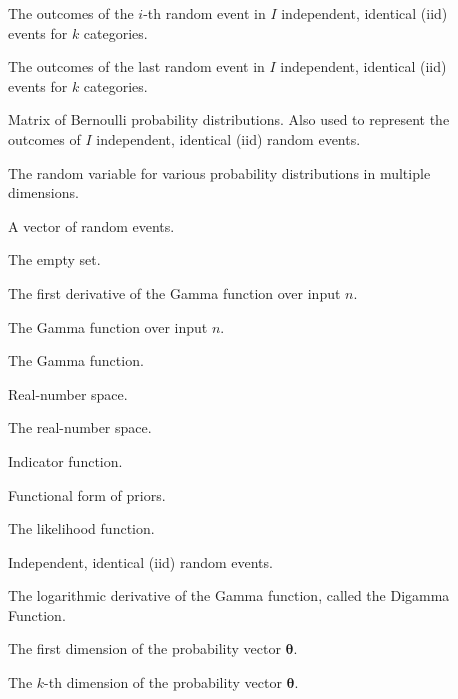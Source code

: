 \begin{description}
	\item [\parbox{2cm}{$\boldsymbol{x_{i}}$}] \parbox{12.5cm}{The outcomes of the $i$-th random event in $I$ independent, identical (iid) events for $k$ categories.}
	\item [\parbox{2cm}{$\boldsymbol{x_{I}}$}] \parbox{12.5cm}{The outcomes of the last random event in $I$ independent, identical (iid) events for $k$ categories.}
	\item [\parbox{2cm}{$\boldsymbol{X}$}] \parbox{12.5cm}{Matrix of Bernoulli probability distributions. Also used to represent the outcomes of $I$ independent, identical (iid) random events.}
	\item [\parbox{2cm}{$\boldsymbol{x}$}] \parbox{12.5cm}{The random variable for various probability distributions in multiple dimensions.}
	\item [\parbox{2cm}{$\boldsymbol{Y}$}] \parbox{12.5cm}{A vector of random events.}
	\item [\parbox{2cm}{$\emptyset$}] \parbox{12.5cm}{The empty set.}
	\item [\parbox{2cm}{$\Gamma'(n)$}] \parbox{12.5cm}{The first derivative of the Gamma function over input $n$.}
	\item [\parbox{2cm}{$\Gamma(n)$}] \parbox{12.5cm}{The Gamma function over input $n$.}
	\item [\parbox{2cm}{$\Gamma$}] \parbox{12.5cm}{The Gamma function.}
	\item [\parbox{2cm}{$\mathbb{R}$}] \parbox{12.5cm}{Real-number space.}
	\item [\parbox{2cm}{$\mathbb{R}$}] \parbox{12.5cm}{The real-number space.}
	\item [\parbox{2cm}{$\mathbbm{1}$}] \parbox{12.5cm}{Indicator function.}
	\item [\parbox{2cm}{$\mathcal{A}(v)$}] \parbox{12.5cm}{Functional form of priors.}
	\item [\parbox{2cm}{$\mathcal{L}$}] \parbox{12.5cm}{The likelihood function.}
	\item [\parbox{2cm}{$\overset{\text{iid}}{\sim}$}] \parbox{12.5cm}{Independent, identical (iid) random events.}
	\item [\parbox{2cm}{$\psi$}] \parbox{12.5cm}{The logarithmic derivative of the Gamma function, called the Digamma Function.}
	\item [\parbox{2cm}{$\theta_{1}$}] \parbox{12.5cm}{The first dimension of the probability vector $\boldsymbol{\theta}$.}
	\item [\parbox{2cm}{$\theta_{k}$}] \parbox{12.5cm}{The $k$-th dimension of the probability vector $\boldsymbol{\theta}$.}

\end{description}
